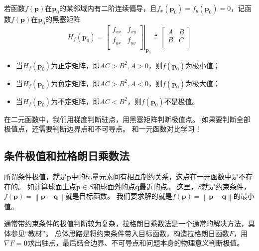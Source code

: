 \begin{theorem}[极值的必要条件]
若函数$f\left( \boldsymbol{p} \right) $在$\boldsymbol{p}_0$的某邻域内有二阶连续偏导，且$f_x\left( \boldsymbol{p}_0 \right) =f_y\left( \boldsymbol{p}_0 \right) =0$，记函数$f\left( \boldsymbol{p} \right) $在$\boldsymbol{p}_0$的黑塞矩阵
\[
H_f\left( \boldsymbol{p}_0 \right) =\left. \left[ \begin{matrix}
	f_{xx}&		f_{xy}\\
	f_{yx}&		f_{yy}\\
\end{matrix} \right] \right|_{\boldsymbol{p}_0}\triangleq \left[ \begin{matrix}
	A&		B\\
	B&		C\\
\end{matrix} \right]
\]
\begin{itemize}
    \item 当$H_f\left( \boldsymbol{p}_0 \right) $为正定矩阵，即$AC>B^2,A>0$，则$f\left( \boldsymbol{p}_0 \right) $为极小值；
    \item 当$H_f\left( \boldsymbol{p}_0 \right) $为负定矩阵，即$AC>B^2,A<0$，则$f\left( \boldsymbol{p}_0 \right) $为极大值；
    \item 当$H_f\left( \boldsymbol{p}_0 \right) $为不定矩阵，即$AC<B^2$，则$f\left( \boldsymbol{p}_0 \right) $不是极值。
\end{itemize}
\end{theorem}

在二元函数中，我们用梯度判断驻点，用黑塞矩阵判断极值点。
如果要判断全部极值点，还需要判断边界点和不可导点。
和一元函数对比学习！

\subsection{条件极值和拉格朗日乘数法}

所谓条件极值，就是$\boldsymbol{p}$中的标量元素间有相互制约关系，这点在一元函数中是不存在的。
如计算球面上点$\boldsymbol{p}\in S$和球面外的点$\boldsymbol{q}$最近的点。
这里，$S$就是约束条件，$f\left( \boldsymbol{p} \right) =\left\| \boldsymbol{p}-\boldsymbol{q} \right\| $就是目标函数。
我们要求解的就是$f\left( \boldsymbol{p} \right) =\left\| \boldsymbol{p}-\boldsymbol{q} \right\| $的最小值。

通常带约束条件的极值判断较为复杂，拉格朗日乘数法是一个通常的解决方法，具体参见“教材\cite{book1}”。
总体思路是将约束条件带入目标函数，构造拉格朗日函数$F$，用$\nabla F=\mathbf{0}$求出驻点，最后结合边界、不可导点和问题本身的物理意义判断极值。




